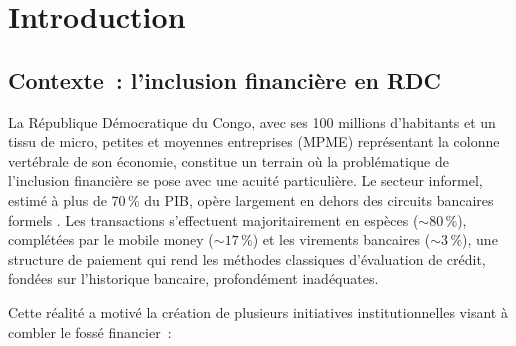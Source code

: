 \documentclass[12pt, a4paper, twocolumn]{article}
\begin{document}
\section{Introduction}
\label{sec:introduction}

\subsection{Contexte~: l'inclusion financière en RDC}
\label{subsec:contexte}

La République Démocratique du Congo, avec ses 100 millions d'habitants et un tissu de micro, petites et moyennes entreprises (MPME) représentant la colonne vertébrale de son économie, constitue un terrain où la problématique de l'inclusion financière se pose avec une acuité particulière. Le secteur informel, estimé à plus de 70\,\% du PIB, opère largement en dehors des circuits bancaires formels \cite{bcc2023}. Les transactions s'effectuent majoritairement en espèces (${\sim}80\,\%$), complétées par le mobile money (${\sim}17\,\%$) et les virements bancaires (${\sim}3\,\%$), une structure de paiement qui rend les méthodes classiques d'évaluation de crédit, fondées sur l'historique bancaire, profondément inadéquates.

Cette réalité a motivé la création de plusieurs initiatives institutionnelles visant à combler le fossé financier~:
\end{document}
